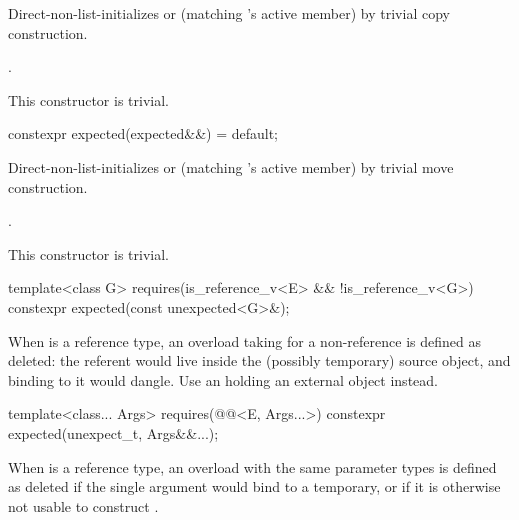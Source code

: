 \begin{itemdescr}
\pnum
\effects
Direct-non-list-initializes  or  (matching 's active member) by trivial copy construction.

\pnum
\ensures
{}.

\pnum
\remarks
This constructor is trivial.
\end{itemdescr}

%
\begin{itemdecl}
constexpr expected(expected&&) = default;
\end{itemdecl}

\begin{itemdescr}
\pnum
\effects
Direct-non-list-initializes  or  (matching 's active member) by trivial move construction.

\pnum
\ensures
{}.

\pnum
\remarks
This constructor is trivial.
\end{itemdescr}

%
\begin{itemdecl}
template<class G>
  requires(is_reference_v<E> && !is_reference_v<G>)
constexpr expected(const unexpected<G>&);
\end{itemdecl}

\begin{itemdescr}
\pnum
\remarks
When  is a reference type, an overload taking  for a non-reference  is defined as deleted: the referent would live inside the (possibly temporary) source  object, and binding  to it would dangle. Use an  holding an external object instead.
\end{itemdescr}

%
\begin{itemdecl}
template<class... Args>
  requires(@@<E, Args...>)
constexpr expected(unexpect_t, Args&&...);
\end{itemdecl}

\begin{itemdescr}
\pnum
\remarks
When  is a reference type, an overload with the same parameter types is defined as deleted if the single argument would bind  to a temporary, or if it is otherwise not usable to construct .
\end{itemdescr}

